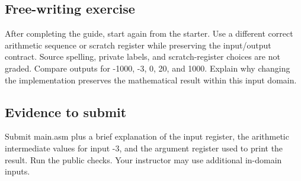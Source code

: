 \subsection{Free-writing
  exercise}\label{001-console-calculation-assignment-free-writing-exercise}

After completing the guide, start again from the starter. Use a
different correct arithmetic sequence or scratch register while
preserving the input/output contract. Source spelling, private labels,
and scratch-register choices are not graded. Compare outputs for -1000,
-3, 0, 20, and 1000. Explain why changing the implementation preserves
the mathematical result within this input domain.

\subsection{Evidence to
  submit}\label{001-console-calculation-assignment-evidence-to-submit}

Submit main.asm plus a brief explanation of the input register, the
arithmetic intermediate values for input -3, and the argument register
used to print the result. Run the public checks. Your instructor may use
additional in-domain inputs.
